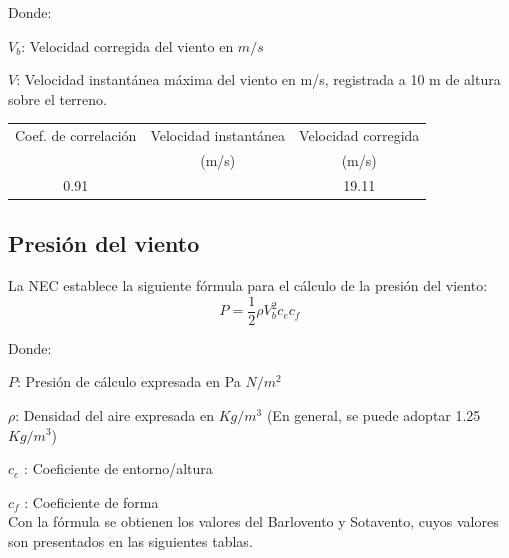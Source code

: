\documentclass{report}
\begin{document}
Donde:

$V_b$: Velocidad corregida del viento en $m/s$

$V$: Velocidad instant\'anea m\'axima del viento en m/s, registrada a 10 m de altura sobre el terreno.

\begin{table}[h]
    \centering
    \begin{tabular}{|c|c|c|}
        \hline
        Coef. de correlaci\'on&Velocidad instant\'anea&Velocidad corregida\\
        &(m/s)&(m/s)\\
        \hline
        0.91&&19.11\\
        \hline
    \end{tabular}
\end{table}

\subsection{Presi\'on del viento}
La NEC establece la siguiente f\'ormula para el c\'alculo de la presi\'on del viento:
$$P = \frac{1}{2} \rho V_b^2 c_e c_f$$

Donde:

$P$: Presi\'on de c\'alculo expresada en Pa $N/m^2$

$\rho$: Densidad del aire expresada en $Kg/m^3$ (En general, se puede adoptar 1.25 $Kg/m^3$)

$c_e$ : Coeficiente de entorno/altura

$c_f$ : Coeficiente de forma
\\
Con la f\'ormula se obtienen los valores del Barlovento y Sotavento, cuyos valores son presentados
en las siguientes tablas.

    \begin{table}[h]
        \centering
    \end{table}
    
    \begin{table}[h]
        \centering
    \end{table}
        
\end{document}
